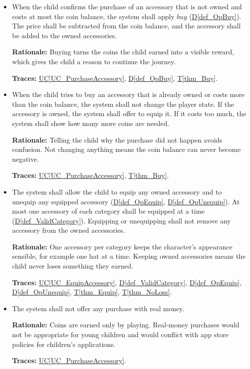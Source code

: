 \documentclass[12pt]{article}
\newcommand{\ucref}[1]{\hyperref[#1]{UC\ref*{#1}}}
\newcounter{reqnum} %
\newcommand{\thmref}[1]{\hyperref[#1]{T\ref*{#1}}}
\newcommand{\defref}[1]{\hyperref[#1]{D\ref*{#1}}}
\begin{document}
\begin{itemize}
\item[\refstepcounter{reqnum}\textbf{FR\thereqnum}\label{FR_Purchase}:]
When the child confirms the purchase of an accessory that is not owned and
costs at most the coin balance, the system shall apply $\mathit{buy}$
(\defref{def_OpBuy}). The price shall be subtracted from the coin balance, and
the accessory shall be added to the owned accessories.

\textbf{Rationale:} Buying turns the coins the child earned into a visible
reward, which gives the child a reason to continue the journey.

\textbf{Traces:} \ucref{UC_PurchaseAccessory}, \defref{def_OpBuy},
\thmref{thm_Buy}.

\item[\refstepcounter{reqnum}\textbf{FR\thereqnum}\label{FR_PurchaseRefused}:]
When the child tries to buy an accessory that is already owned or costs more
than the coin balance, the system shall not change the player state. If the
accessory is owned, the system shall offer to equip it. If it costs too much,
the system shall show how many more coins are needed.

\textbf{Rationale:} Telling the child why the purchase did not happen avoids
confusion. Not changing anything means the coin balance can never become
negative.

\textbf{Traces:} \ucref{UC_PurchaseAccessory}, \thmref{thm_Buy}.

\item[\refstepcounter{reqnum}\textbf{FR\thereqnum}\label{FR_Equip}:]
The system shall allow the child to equip any owned accessory and to unequip
any equipped accessory (\defref{def_OpEquip}, \defref{def_OpUnequip}). At most
one accessory of each category shall be equipped at a time
(\defref{def_ValidCategory}). Equipping or unequipping shall not remove any
accessory from the owned accessories.

\textbf{Rationale:} One accessory per category keeps the character's
appearance sensible, for example one hat at a time. Keeping owned accessories
means the child never loses something they earned.

\textbf{Traces:} \ucref{UC_EquipAccessory}, \defref{def_ValidCategory},
\defref{def_OpEquip}, \defref{def_OpUnequip}, \thmref{thm_Equip},
\thmref{thm_NoLoss}.

\item[\refstepcounter{reqnum}\textbf{FR\thereqnum}\label{FR_NoRealMoney}:]
The system shall not offer any purchase with real money.

\textbf{Rationale:} Coins are earned only by playing. Real-money purchases
would not be appropriate for young children and would conflict with app store
policies for children's applications.

\textbf{Traces:} \ucref{UC_PurchaseAccessory}.

\end{itemize}
\end{document}
